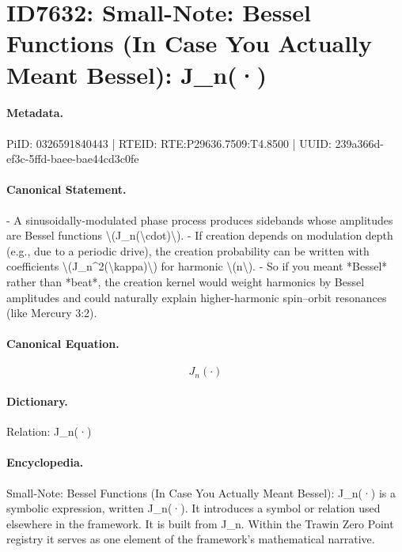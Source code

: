 \section*{ID7632: Small-Note: Bessel Functions (In Case You Actually Meant Bessel): J\_n(·)}
\paragraph{Metadata.}
PiID: 0326591840443 | RTEID: RTE:P29636.7509:T4.8500 | UUID: 239a366d-ef3c-5ffd-baee-bae44cd3c0fe

\paragraph{Canonical Statement.}
- A sinusoidally-modulated phase process produces sidebands whose amplitudes are Bessel functions \textbackslash{}(J\_n(\textbackslash{}cdot)\textbackslash{}). - If creation depends on modulation depth (e.g., due to a periodic drive), the creation probability can be written with coefficients \textbackslash{}(J\_n\textasciicircum{}2(\textbackslash{}kappa)\textbackslash{}) for harmonic \textbackslash{}(n\textbackslash{}). - So if you meant *Bessel* rather than *beat*, the creation kernel would weight harmonics by Bessel amplitudes and could naturally explain higher-harmonic spin–orbit resonances (like Mercury 3:2).

\paragraph{Canonical Equation.}
\[
J_n(\cdot)
\]

\paragraph{Dictionary.}
Relation: J\_n(·)

\paragraph{Encyclopedia.}
Small-Note: Bessel Functions (In Case You Actually Meant Bessel): J\_n(·) is a symbolic expression, written J\_n(·). It introduces a symbol or relation used elsewhere in the framework. It is built from J\_n. Within the Trawin Zero Point registry it serves as one element of the framework's mathematical narrative.
